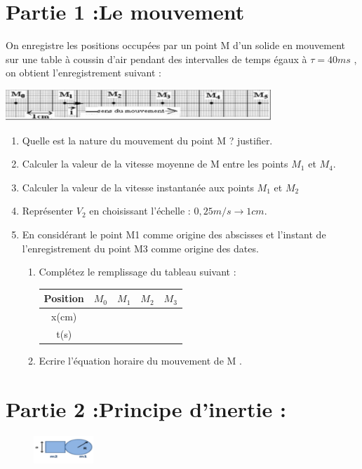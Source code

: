 \documentclass[12pt]{article}
\begin{document}
 \section*{Partie 1 :Le mouvement }
On enregistre les positions occupées par un point M d’un solide en
mouvement sur une table à coussin d’air pendant des intervalles de
temps égaux à $\tau = 40 ms$ , on obtient l’enregistrement suivant :
\begin{center}
            \includegraphics[width=0.75\textwidth]{./img/img01.png}
\end{center}
\begin{enumerate}
\item Quelle est la nature du mouvement du point M ? justifier.
\item Calculer la valeur de la vitesse moyenne de M entre les points $M_1$ et $M_4$.
\item Calculer la valeur de la vitesse instantanée aux points $M_1$ et $M_2$
\item Représenter $V_2$ en choisissant l’échelle : $0,25m/s \rightarrow 1cm$.
\item En considérant le point M1 comme origine des abscisses et l’instant de
l’enregistrement du point M3 comme origine des dates.
        \begin{enumerate}
               \item Complétez le remplissage du tableau suivant :
 \begin{center}
    \begin{tabular} { | c | c | c |c|c| }
    \hline\hline
        Position & $M_0$ & $M_1$ & $M_2$ & $M_3$\\\hline
        x(cm)    & & & & \\\hline
        t(s)     && & & \\\hline
    \hline
    \end{tabular}
    \end{center}
\item Ecrire l’équation horaire du mouvement de M .
        \end{enumerate}
\end{enumerate}

 \section*{Partie 2 :Principe d’inertie :  }
         \begin{figure}
        \includegraphics[width=0.2\textwidth]{./img/img02.png}
    \end{figure}
\end{document}
